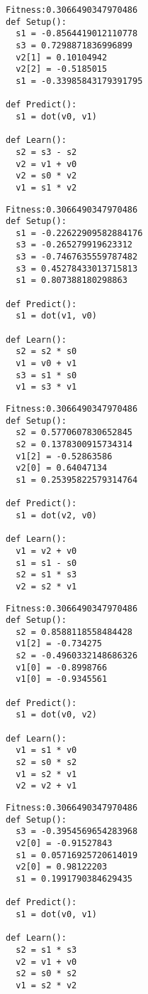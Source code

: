 \documentclass[twocolumn, a4j]{jarticle}
\begin{document}
\begin{lstlisting}[caption= No. 5.16]
Fitness:0.3066490347970486 
def Setup():
  s1 = -0.8564419012110778
  s3 = 0.7298871836996899
  v2[1] = 0.10104942
  v2[2] = -0.5185015
  s1 = -0.33985843179391795

def Predict():
  s1 = dot(v0, v1)

def Learn():
  s2 = s3 - s2
  v2 = v1 + v0
  v2 = s0 * v2
  v1 = s1 * v2

\end{lstlisting}

\newpage

\begin{lstlisting}[caption= No. 5.17]
Fitness:0.3066490347970486 
def Setup():
  s1 = -0.22622909582884176
  s3 = -0.265279919623312
  s3 = -0.7467635559787482
  s3 = 0.45278433013715813
  s1 = 0.807388180298863

def Predict():
  s1 = dot(v1, v0)

def Learn():
  s2 = s2 * s0
  v1 = v0 + v1
  s3 = s1 * s0
  v1 = s3 * v1

\end{lstlisting}

\begin{lstlisting}[caption= No. 5.18]
Fitness:0.3066490347970486 
def Setup():
  s2 = 0.5770607830652845
  s2 = 0.1378300915734314
  v1[2] = -0.52863586
  v2[0] = 0.64047134
  s1 = 0.25395822579314764

def Predict():
  s1 = dot(v2, v0)

def Learn():
  v1 = v2 + v0
  s1 = s1 - s0
  s2 = s1 * s3
  v2 = s2 * v1

\end{lstlisting}

\newpage

\begin{lstlisting}[caption= No. 5.19]
Fitness:0.3066490347970486 
def Setup():
  s2 = 0.8588118558484428
  v1[2] = -0.734275
  s2 = -0.4960332148686326
  v1[0] = -0.8998766
  v1[0] = -0.9345561

def Predict():
  s1 = dot(v0, v2)

def Learn():
  v1 = s1 * v0
  s2 = s0 * s2
  v1 = s2 * v1
  v2 = v2 + v1

\end{lstlisting}

\begin{lstlisting}[caption= No. 5.20]
Fitness:0.3066490347970486 
def Setup():
  s3 = -0.3954569654283968
  v2[0] = -0.91527843
  s1 = 0.05716925720614019
  v2[0] = 0.98122203
  s1 = 0.1991790384629435

def Predict():
  s1 = dot(v0, v1)

def Learn():
  s2 = s1 * s3
  v2 = v1 + v0
  s2 = s0 * s2
  v1 = s2 * v2

\end{lstlisting}
\end{document}

